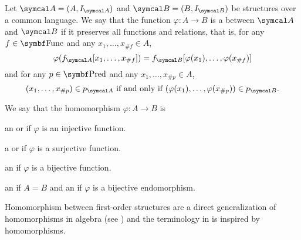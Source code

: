 \begin{definition}\label{def:first_order_homomorphism}\cite[definition 23.8]{OpenLogic20201202}
  Let \( \Cal{A} = (A, I_{\Cal{A}}) \) and \( \Cal{B} = (B, I_{\Cal{B}}) \) be structures over a common language. We say that the function \( \varphi: A \to B \) is a  between \( \Cal{A} \) and \( \Cal{B} \) if it preserves all functions and relations, that is, for any \( f \in \Cat{Func} \) and any \( x_1, \ldots, x_{\#f} \in A \),
  \begin{equation*}
    \varphi(f_{\Cal{A}}[x_1, \ldots, x_{\#f}]) = f_{\Cal{B}}[\varphi(x_1), \ldots, \varphi(x_{\#f})]
  \end{equation*}
  and for any \( p \in \Cat{Pred} \) and any \( x_1, \ldots, x_{\#p} \in A \),
  \begin{equation*}
    (x_1, \ldots, x_{\#p}) \in p_{\Cal{A}} \text{ if and only if } (\varphi(x_1), \ldots, \varphi(x_{\#p})) \in p_{\Cal{B}}.
  \end{equation*}

  We say that the homomorphism \( \varphi: A \to B \) is
  \begin{defenum}
     an  or  if \( \varphi \) is an injective function.

     a  or  if \( \varphi \) is a surjective function.

     an  if \( \varphi \) is a bijective function.

     an  if \( A = B \) and an  if \( \varphi \) is a bijective endomorphism.
  \end{defenum}

  Homomorphism between first-order structures are a direct generalization of homomorphisms in algebra (see ) and the terminology in  is inspired by homomorphisms.
\end{definition}

